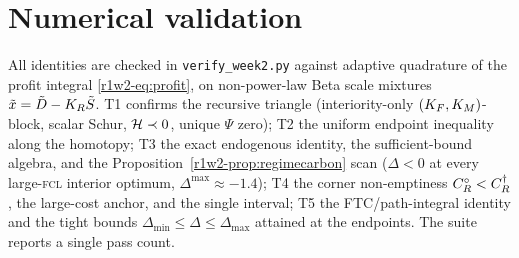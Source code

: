\section{Numerical validation}\label{r1w2-sec:num}

All identities are checked in \texttt{verify\_week2.py} against adaptive
quadrature of the profit integral \eqref{r1w2-eq:profit}, on non-power-law Beta scale
mixtures $\tilde x=\tilde D-K_R\tilde S$. T1 confirms the recursive triangle
(interiority-only $(K_F,K_M)$-block, scalar Schur, $\mathcal H\prec0$, unique $\Psi$
zero); T2 the uniform endpoint inequality along the homotopy; T3 the exact
endogenous identity, the sufficient-bound algebra, and the
Proposition~\ref{r1w2-prop:regimecarbon} scan ($\Delta<0$ at every large-\textsc{fcl}
interior optimum, $\Delta^{\max}\approx-1.4$); T4 the corner non-emptiness
$C_R^{\circ}<C_R^{\dagger}$, the large-cost anchor, and the single interval; T5
the FTC/path-integral identity and the tight bounds $\Delta_{\min}\le\Delta\le\Delta_{\max}$
attained at the endpoints. The suite reports a single pass count.
